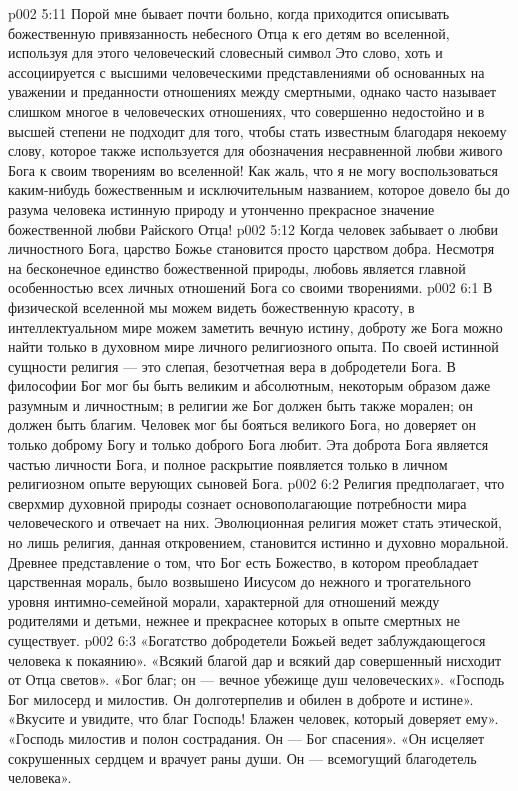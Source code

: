\vs p002 5:11 \pc Порой мне бывает почти больно, когда приходится описывать божественную привязанность небесного Отца к его детям во вселенной, используя для этого человеческий словесный символ  Это слово, хоть и ассоциируется с высшими человеческими представлениями об основанных на уважении и преданности отношениях между смертными, однако часто называет слишком многое в человеческих отношениях, что совершенно недостойно и в высшей степени не подходит для того, чтобы стать известным благодаря некоему слову, которое также используется для обозначения несравненной любви живого Бога к своим творениям во вселенной! Как жаль, что я не могу воспользоваться каким\hyp{}нибудь божественным и исключительным названием, которое довело бы до разума человека истинную природу и утонченно прекрасное значение божественной любви Райского Отца!
\vs p002 5:12 \pc Когда человек забывает о любви личностного Бога, царство Божье становится просто царством добра. Несмотря на бесконечное единство божественной природы, любовь является главной особенностью всех личных отношений Бога со своими творениями.
\vs p002 6:1 В физической вселенной мы можем видеть божественную красоту, в интеллектуальном мире можем заметить вечную истину, доброту же Бога можно найти только в духовном мире личного религиозного опыта. По своей истинной сущности религия --- это слепая, безотчетная вера в добродетели Бога. В философии Бог мог бы быть великим и абсолютным, некоторым образом даже разумным и личностным; в религии же Бог должен быть также морален; он должен быть благим. Человек мог бы бояться великого Бога, но доверяет он только доброму Богу и только доброго Бога любит. Эта доброта Бога является частью личности Бога, и полное раскрытие появляется только в личном религиозном опыте верующих сыновей Бога.
\vs p002 6:2 Религия предполагает, что сверхмир духовной природы сознает основополагающие потребности мира человеческого и отвечает на них. Эволюционная религия может стать этической, но лишь религия, данная откровением, становится истинно и духовно моральной. Древнее представление о том, что Бог есть Божество, в котором преобладает царственная мораль, было возвышено Иисусом до нежного и трогательного уровня интимно\hyp{}семейной морали, характерной для отношений между родителями и детьми, нежнее и прекраснее которых в опыте смертных не существует.
\vs p002 6:3 \pc «Богатство добродетели Божьей ведет заблуждающегося человека к покаянию». «Всякий благой дар и всякий дар совершенный нисходит от Отца светов». «Бог благ; он --- вечное убежище душ человеческих». «Господь Бог милосерд и милостив. Он долготерпелив и обилен в доброте и истине». «Вкусите и увидите, что благ Господь! Блажен человек, который доверяет ему». «Господь милостив и полон сострадания. Он --- Бог спасения». «Он исцеляет сокрушенных сердцем и врачует раны души. Он --- всемогущий благодетель человека».
